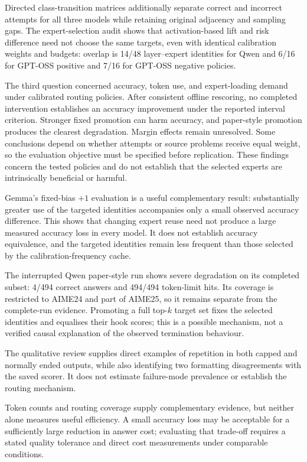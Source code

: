 \documentclass[12pt,a4paper,twoside,openright]{book}
\begin{document}
Directed class-transition matrices additionally separate correct and incorrect
attempts for all three models while retaining original adjacency and sampling
gaps. The expert-selection audit shows that activation-based lift and risk
difference need not choose the same targets, even with identical calibration
weights and budgets: overlap is 14/48 layer--expert identities for Qwen and
6/16 for GPT-OSS positive and 7/16 for GPT-OSS negative policies.

The third question concerned accuracy, token use, and expert-loading
demand under calibrated routing policies. After consistent offline
rescoring, no completed intervention establishes an accuracy improvement
under the reported interval criterion. Stronger fixed promotion can harm
accuracy, and paper-style promotion produces the clearest degradation.
Margin effects remain unresolved. Some conclusions depend on whether
attempts or source problems receive equal weight, so the evaluation
objective must be specified before replication. These findings concern
the tested policies and do not establish that the selected experts are
intrinsically beneficial or harmful.

Gemma's fixed-bias $+1$ evaluation is a useful complementary result:
substantially greater use of the targeted identities accompanies only a
small observed accuracy difference. This shows that changing expert reuse
need not produce a large measured accuracy loss in every model. It does
not establish accuracy equivalence, and the targeted identities remain
less frequent than those selected by the calibration-frequency cache.

The interrupted
Qwen paper-style run shows severe degradation on its completed subset:
4/494 correct answers and 494/494 token-limit hits. Its coverage is restricted
to AIME24 and part of AIME25, so it remains separate from the complete-run
evidence. Promoting a full top-$k$ target set fixes the selected identities
and equalises their hook scores; this is a possible mechanism, not a verified
causal explanation of the observed termination behaviour.

The qualitative review supplies direct examples of repetition in both
capped and normally ended outputs, while also identifying two formatting
disagreements with the saved scorer. It does not estimate failure-mode
prevalence or establish the routing mechanism.

Token counts and routing coverage supply complementary evidence, but
neither alone measures useful efficiency. A small accuracy loss may be
acceptable for a sufficiently large reduction in answer cost; evaluating
that trade-off requires a stated quality tolerance and direct cost
measurements under comparable conditions.
\end{document}
